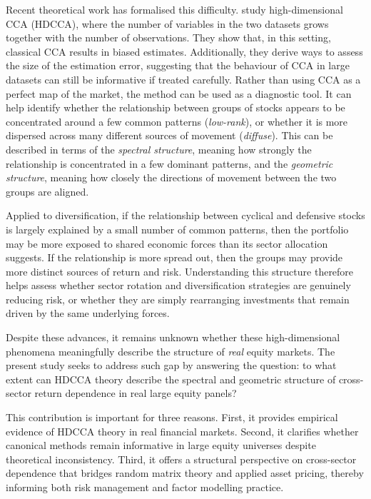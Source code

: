 \documentclass[12pt]{report} %
\begin{document}
Recent theoretical work has formalised this difficulty. \citet{BykhovskayaGorin2023} study 
high-dimensional CCA (HDCCA), where the number of variables in the two datasets grows together 
with the number of observations. They show that, in this setting, classical CCA results in 
biased estimates. Additionally, they derive ways to assess the size of the estimation error, 
suggesting that the behaviour of CCA in large datasets can still be informative if treated 
carefully. Rather than using CCA as a perfect map of the market, the method can be used as a 
diagnostic tool. It can help identify whether the relationship between groups of stocks 
appears to be concentrated around a few common patterns (\textit{low-rank}), or whether it is 
more dispersed across many different sources of movement (\textit{diffuse}). This can be 
described in terms of the \textit{spectral structure}, meaning how strongly the relationship is 
concentrated in a few dominant patterns, and the \textit{geometric structure}, meaning how 
closely the directions of movement between the two groups are aligned.

Applied to diversification, if the relationship between cyclical 
and defensive stocks is largely explained by a small number of common patterns, then the 
portfolio may be more exposed to shared economic forces than its sector allocation suggests. If 
the relationship is more spread out, then the groups may provide more distinct sources of 
return and risk. Understanding this structure therefore helps assess whether sector rotation 
and diversification strategies are genuinely reducing risk, or whether they are simply 
rearranging investments that remain driven by the same underlying forces.

Despite these advances, it remains unknown whether these high-dimensional phenomena 
meaningfully describe the structure of \textit{real} equity markets. The present study seeks to 
address such gap by answering the question: to what extent 
can HDCCA theory describe the spectral and geometric structure of 
cross-sector return dependence in real large equity panels? 

This contribution is important for three reasons. First, it provides empirical evidence 
of HDCCA theory in real financial markets. Second, it clarifies whether 
canonical methods remain informative in large equity universes despite theoretical 
inconsistency. Third, it offers a structural perspective on cross-sector dependence that 
bridges random matrix theory and applied asset pricing, thereby informing both risk 
management and factor modelling practice.
\end{document}
